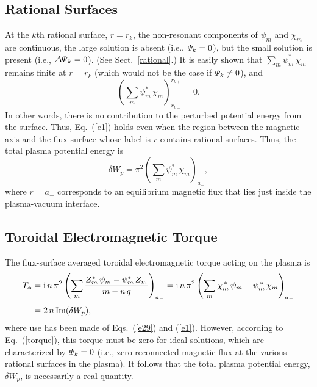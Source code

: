 \documentclass[12pt,prb,aps]{revtex4-1}
\begin{document}
\subsection{Rational Surfaces}
At the $k$th rational surface, $r=r_k$, the non-resonant components of $\psi_m$ and $\chi_m$ are continuous,  the 
large solution is absent (i.e., ${\mit\Psi}_k=0$), but the small solution is present  (i.e., ${\mit\Delta\Psi}_k=0$). (See Sect.~\ref{rational}.)
It is easily shown that $\sum_m \psi_m^\ast\,\chi_m$ remains finite at $r=r_k$ (which would not be the case if ${\mit\Psi}_k\neq 0$), and\,\cite{tj}
\begin{equation}
\left(\sum_m\psi_m^\ast\,\chi_m\right)_{r_{k-}}^{r_{k+}}=0.
\end{equation}
In other words, there is no contribution to the perturbed potential energy from the surface. Thus, Eq.~(\ref{e1}) holds even when the region between the
magnetic axis and the flux-surface whose label is $r$ contains rational surfaces. 
Thus, the total plasma potential energy is 
\begin{equation}\label{a32}
\delta W_p =\pi^2\left(\sum_m\psi_m^\ast\,\chi_m\right)_{a_-},
\end{equation}
where $r=a_-$ corresponds to an equilibrium magnetic flux that lies just inside the plasma-vacuum interface. 

\subsection{Toroidal Electromagnetic Torque}
The flux-surface averaged toroidal electromagnetic torque acting on the plasma   is\,\cite{tj,ideal}
\begin{align}\label{b27}
T_\phi& = {\rm i}\,n\,\pi^2\left(\sum_m\frac{Z_m^\ast\,\psi_m-\psi_m^\ast\,Z_m}{m-n\,q}\right)_{a_-}= {\rm i}\,n\,\pi^2\left(\sum_m
\chi_m^{\,\ast}\,\psi_m - \psi_m^{\,\ast}\,\chi_m\right)_{a_-}\nonumber\\[0.5ex]
&= 2\,n\,{\rm Im}(\delta W_p),
\end{align}
where use has been made of Eqs.~(\ref{e29}) and (\ref{e1}). 
However, according to Eq.~(\ref{torque}), this torque must be zero for ideal solutions, which are characterized by ${\mit\Psi}_k=0$ (i.e., zero reconnected magnetic
flux at the various rational surfaces in the plasma).\cite{tj}
It follows that
 the total plasma potential energy, $\delta W_p$, is necessarily a real quantity. 
\end{document}
